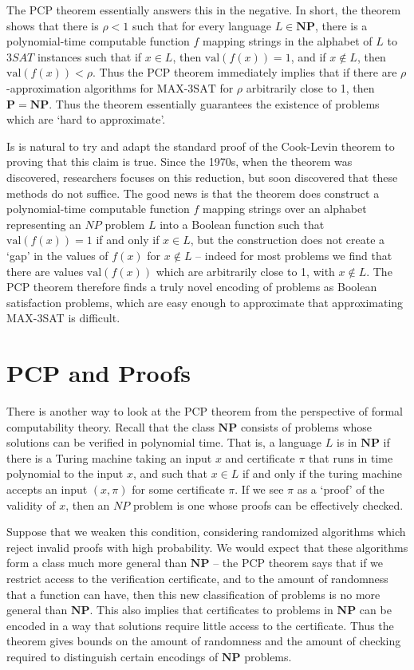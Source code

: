 The PCP theorem essentially answers this in the negative. In short, the theorem shows that there is $\rho < 1$ such that for every language $L \in \mathbf{NP}$, there is a polynomial-time computable function $f$ mapping strings in the alphabet of $L$ to $3SAT$ instances such that if $x \in L$, then $\text{val}(f(x)) = 1$, and if $x \not \in L$, then $\text{val}(f(x)) < \rho$. Thus the PCP theorem immediately implies that if there are $\rho$-approximation algorithms for $\text{MAX-3SAT}$ for $\rho$ arbitrarily close to 1, then $\mathbf{P} = \mathbf{NP}$. Thus the theorem essentially guarantees the existence of problems which are `hard to approximate'.

Is is natural to try and adapt the standard proof of the Cook-Levin theorem to proving that this claim is true. Since the 1970s, when the theorem was discovered, researchers focuses on this reduction, but soon discovered that these methods do not suffice. The good news is that the theorem does construct a polynomial-time computable function $f$ mapping strings over an alphabet representing an $NP$ problem $L$ into a Boolean function such that $\text{val}(f(x)) = 1$ if and only if $x \in L$, but the construction does not create a `gap' in the values of $f(x)$ for $x \not \in L$ -- indeed for most problems we find that there are values $\text{val}(f(x))$ which are arbitrarily close to 1, with $x \not \in L$. The PCP theorem therefore finds a truly novel encoding of problems as Boolean satisfaction problems, which are easy enough to approximate that approximating MAX-3SAT is difficult.

\section{PCP and Proofs}

There is another way to look at the PCP theorem from the perspective of formal computability theory. Recall that the class $\mathbf{NP}$ consists of problems whose solutions can be verified in polynomial time. That is, a language $L$ is in $\mathbf{NP}$ if there is a Turing machine taking an input $x$ and certificate $\pi$ that runs in time polynomial to the input $x$, and such that $x \in L$ if and only if the turing machine accepts an input $(x, \pi)$ for some certificate $\pi$. If we see $\pi$ as a `proof' of the validity of $x$, then an $NP$ problem is one whose proofs can be effectively checked.

Suppose that we weaken this condition, considering randomized algorithms which reject invalid proofs with high probability. We would expect that these algorithms form a class much more general than $\mathbf{NP}$ -- the PCP theorem says that if we restrict access to the verification certificate, and to the amount of randomness that a function can have, then this new classification of problems is no more general than $\mathbf{NP}$. This also implies that certificates to problems in $\mathbf{NP}$ can be encoded in a way that solutions require little access to the certificate. Thus the theorem gives bounds on the amount of randomness and the amount of checking required to distinguish certain encodings of $\mathbf{NP}$ problems.

